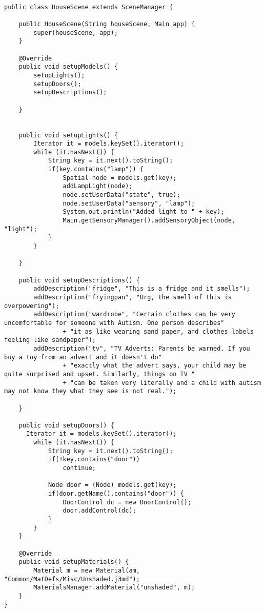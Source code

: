 \begin{lstlisting}

public class HouseScene extends SceneManager {

    public HouseScene(String houseScene, Main app) {
        super(houseScene, app);
    }

    @Override
    public void setupModels() {
        setupLights();
        setupDoors();
        setupDescriptions();

    }
    
    
    public void setupLights() {
        Iterator it = models.keySet().iterator();
        while (it.hasNext()) {
            String key = it.next().toString();
            if(key.contains("lamp")) {
                Spatial node = models.get(key);
                addLampLight(node);
                node.setUserData("state", true);
                node.setUserData("sensory", "lamp");
                System.out.println("Added light to " + key);
                Main.getSensoryManager().addSensoryObject(node, "light");
            }
        }
        
    }
    
    public void setupDescriptions() {
        addDescription("fridge", "This is a fridge and it smells");
        addDescription("fryingpan", "Urg, the smell of this is overpowering");
        addDescription("wardrobe", "Certain clothes can be very uncomfortable for someone with Autism. One person describes"
                + "it as like wearing sand paper, and clothes labels feeling like sandpaper");
        addDescription("tv", "TV Adverts: Parents be warned. If you buy a toy from an advert and it doesn't do"
                + "exactly what the advert says, your child may be quite surprised and upset. Similarly, things on TV "
                + "can be taken very literally and a child with autism may not know they what they see is not real.");
        
    }
    
    public void setupDoors() {
      Iterator it = models.keySet().iterator();
        while (it.hasNext()) {
            String key = it.next().toString();
            if(!key.contains("door")) 
                continue; 
            
            Node door = (Node) models.get(key);
            if(door.getName().contains("door")) {
                DoorControl dc = new DoorControl();
                door.addControl(dc);               
            }
        }
    }

    @Override
    public void setupMaterials() {
        Material m = new Material(am, "Common/MatDefs/Misc/Unshaded.j3md");
        MaterialsManager.addMaterial("unshaded", m); 
    }
}

\end{lstlisting}

